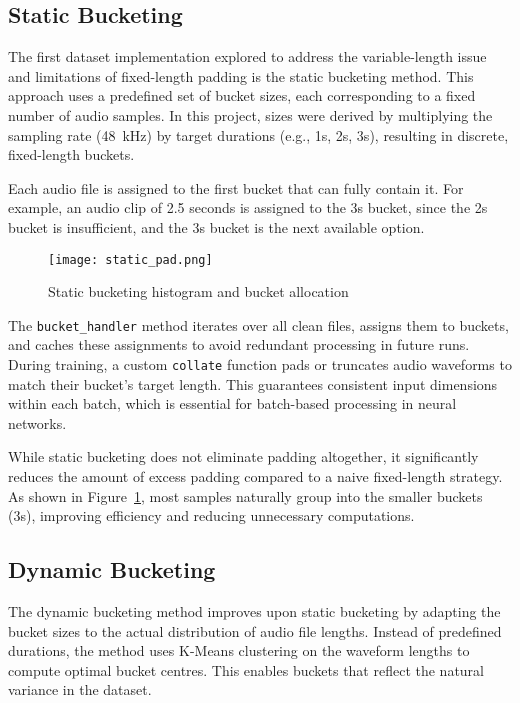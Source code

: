 \subsection{Static Bucketing}
\label{subsec:static_dataset}

The first dataset implementation explored to address the variable-length issue and limitations of fixed-length padding is the static bucketing method. This approach uses a predefined set of bucket sizes, each corresponding to a fixed number of audio samples. In this project, sizes were derived by multiplying the sampling rate (48~kHz) by target durations (e.g., 1s, 2s, 3s), resulting in discrete, fixed-length buckets.

Each audio file is assigned to the first bucket that can fully contain it. For example, an audio clip of 2.5 seconds is assigned to the 3s bucket, since the 2s bucket is insufficient, and the 3s bucket is the next available option.

\begin{figure}[H]
    \centering
    \texttt{[image: static\_pad.png]}
    \caption{Static bucketing histogram and bucket allocation}
    \label{fig:static_pad}
\end{figure}

The \texttt{bucket\_handler} method iterates over all clean files, assigns them to buckets, and caches these assignments to avoid redundant processing in future runs. During training, a custom \texttt{collate} function pads or truncates audio waveforms to match their bucket’s target length. This guarantees consistent input dimensions within each batch, which is essential for batch-based processing in neural networks.

While static bucketing does not eliminate padding altogether, it significantly reduces the amount of excess padding compared to a naive fixed-length strategy. As shown in Figure~\ref{fig:static_pad}, most samples naturally group into the smaller buckets (3s), improving efficiency and reducing unnecessary computations.

\subsection{Dynamic Bucketing}
\label{subsec:dynamic_dataset}

The dynamic bucketing method improves upon static bucketing by adapting the bucket sizes to the actual distribution of audio file lengths. Instead of predefined durations, the method uses K-Means clustering on the waveform lengths to compute optimal bucket centres. This enables buckets that reflect the natural variance in the dataset.

